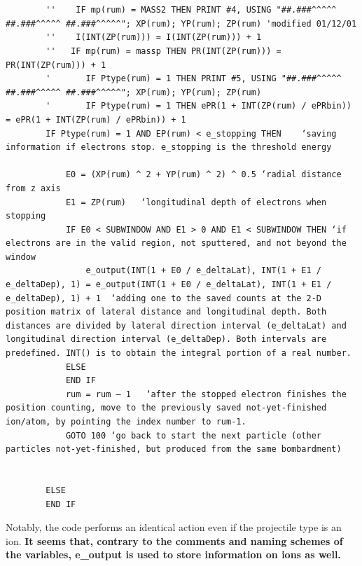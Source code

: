 \documentclass[10pt, reqno]{exam}
\begin{document}
\begin{verbatim}

    
        ''    IF mp(rum) = MASS2 THEN PRINT #4, USING "##.###^^^^^ ##.###^^^^^ ##.###^^^^^"; XP(rum); YP(rum); ZP(rum) 'modified 01/12/01
        ''    I(INT(ZP(rum))) = I(INT(ZP(rum))) + 1
        ''   IF mp(rum) = massp THEN PR(INT(ZP(rum))) = PR(INT(ZP(rum))) + 1
        '       IF Ptype(rum) = 1 THEN PRINT #5, USING "##.###^^^^^ ##.###^^^^^ ##.###^^^^^"; XP(rum); YP(rum); ZP(rum)
        '       IF Ptype(rum) = 1 THEN ePR(1 + INT(ZP(rum) / ePRbin)) = ePR(1 + INT(ZP(rum) / ePRbin)) + 1
        IF Ptype(rum) = 1 AND EP(rum) < e_stopping THEN    ‘saving information if electrons stop. e_stopping is the threshold energy
    
            E0 = (XP(rum) ^ 2 + YP(rum) ^ 2) ^ 0.5 ‘radial distance from z axis
            E1 = ZP(rum)   ‘longitudinal depth of electrons when stopping
            IF E0 < SUBWINDOW AND E1 > 0 AND E1 < SUBWINDOW THEN ‘if electrons are in the valid region, not sputtered, and not beyond the window
                e_output(INT(1 + E0 / e_deltaLat), INT(1 + E1 / e_deltaDep), 1) = e_output(INT(1 + E0 / e_deltaLat), INT(1 + E1 / e_deltaDep), 1) + 1  ‘adding one to the saved counts at the 2-D position matrix of lateral distance and longitudinal depth. Both distances are divided by lateral direction interval (e_deltaLat) and longitudinal direction interval (e_deltaDep). Both intervals are predefined. INT() is to obtain the integral portion of a real number. 
            ELSE
            END IF
            rum = rum – 1   ‘after the stopped electron finishes the position counting, move to the previously saved not-yet-finished ion/atom, by pointing the index number to rum-1. 
            GOTO 100 ‘go back to start the next particle (other particles not-yet-finished, but produced from the same bombardment)
    
    
        ELSE
        END IF
\end{verbatim}
Notably, the code performs an identical action even if the projectile type is an ion. \textbf{It seems that, contrary to the comments and naming schemes of the variables, e\_output is used to store information on ions as well.}
\end{document}
